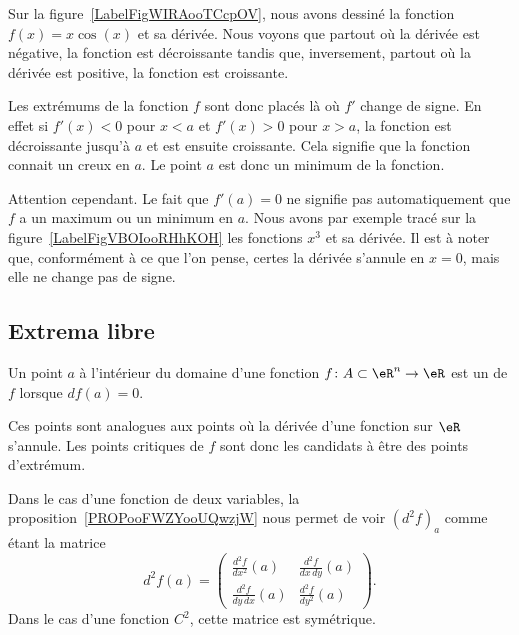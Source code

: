 Sur la figure~\ref{LabelFigWIRAooTCcpOV}, nous avons dessiné la fonction \( f(x)=x\cos(x)\) et sa dérivée. Nous voyons que partout où la dérivée est négative, la fonction est décroissante tandis que, inversement, partout où la dérivée est positive, la fonction est croissante.
\newcommand{\CaptionFigWIRAooTCcpOV}{La fonction \( f(x)=x\cos(x)\) en bleu et sa dérivée en rouge.}


Les extrémums de la fonction \( f\) sont donc placés là où \( f'\) change de signe. En effet si \( f'(x)<0\) pour \( x<a\) et \( f'(x)>0\) pour \( x>a\), la fonction est décroissante jusqu'à \( a\) et est ensuite croissante. Cela signifie que la fonction connait un creux en \( a\). Le point \( a\) est donc un minimum de la fonction.

Attention cependant. Le fait que \( f'(a)=0\) ne signifie pas automatiquement que \( f\) a un maximum ou un minimum en \( a\). Nous avons par exemple tracé sur la figure~\ref{LabelFigVBOIooRHhKOH} les fonctions \( x^3\) et sa dérivée. Il est à noter que, conformément à ce que l'on pense, certes la dérivée s'annule en \( x=0\), mais elle ne change pas de signe.

\newcommand{\CaptionFigVBOIooRHhKOH}{La dérivée de \( x^3\) s'annule en \( x=0\), mais ce n'est ni un minimum ni un maximum.}


\subsection{Extrema libre}

\begin{definition}      \label{DEFooYJLZooLkEAYf}
	Un point \( a\) à l'intérieur du domaine d'une fonction \( f\colon A\subset\eR^n\to \eR\) est un  de \( f\) lorsque \( df(a)=0\).
\end{definition}

Ces points sont analogues aux points où la dérivée d'une fonction sur \( \eR\) s'annule. Les points critiques de \( f\) sont donc les candidats à être des points d'extrémum.

Dans le cas d'une fonction de deux variables, la proposition~\ref{PROPooFWZYooUQwzjW} nous permet de voir \( (d^2f)_a\) comme étant la matrice
\begin{equation}
	d^2f(a)=\begin{pmatrix}
		\frac{ d^2f  }{ dx^2 }(a)   & \frac{ d^2f  }{ dx\,dy }(a) \\
		\frac{ d^2f  }{ dy\,dx }(a) & \frac{ d^2f  }{ dy^2 }(a)
	\end{pmatrix}.
\end{equation}
Dans le cas d'une fonction \( C^2\), cette matrice est symétrique.

